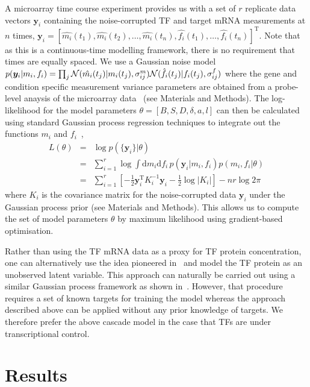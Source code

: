 \documentclass{pnastwo}
\begin{document}
\begin{article}
A microarray time course experiment provides us with a set of $r$
replicate data vectors $\bm y_i$ containing the noise-corrupted TF and target mRNA
measurements at $n$ times,
$\bm y_i=[\hat{m_i}(t_1),\hat{m_i}(t_2),\ldots,\hat{m_i}(t_n),\hat{f_i}(t_1),\ldots,\hat{f_i}(t_n)]^\mathrm{T}$. Note
that as this is a continuous-time modelling framework, there is no
requirement that times are equally spaced. We use a Gaussian noise model
$p(\bm y_i|m_i,f_i)=\prod_{j}{\cal
  N}(\hat{m_i}(t_j)|m_i(t_j),\sigma^m_{ij}){\cal
  N}(\hat{f_i}(t_j)|f_i(t_j),\sigma^f_{ij})$ where the gene and condition
specific measurement variance parameters are obtained from a probe-level anaysis of the microarray data~\cite{Liu2005,Pearson2009} (see
Materials and Methods). The log-likelihood for the model parameters
$\theta=[B,S,D,\delta,a,l]$ can then be calculated using standard Gaussian process regression
techniques to integrate out the functions $m_i$ and $f_i$~\cite{Rasmussen2006},
\begin{eqnarray*}
L(\theta) & = & \log p(\{\bm y_i\}|\theta) \\
& = & \sum_{i=1}^r \log \!\int \!\mathrm{d}m_i\mathrm{d}f_i\,
p(\bm y_i|m_i,f_i)p(m_i,f_i|\theta)  \\
& = & \sum_{i=1}^r \left[-\frac{1}{2}\bm y_i^\mathrm{T} K_i^{-1} \bm y_i -
\frac{1}{2}\log|K_i|\right] -nr\log 2\pi
\end{eqnarray*}
where $K_i$ is the covariance matrix for the
noise-corrupted data $\bm y_i$ under the Gaussian process prior (see
Materials and Methods). This allows us to compute the set of model
parameters $\theta$ by maximum
likelihood using gradient-based optimisation. 

Rather than using the TF mRNA data as a proxy for TF protein concentration,
one can alternatively use the idea pioneered
in~\cite{Barenco2006a} and model the TF protein as an unobserved
latent variable. This approach can naturally be carried out using a
similar Gaussian process framework as shown in~\cite{Gao2008}. However, that procedure requires a set of known
targets for training the model whereas the approach described above
can be applied without any prior knowledge of targets. We therefore
prefer the above cascade model in the case that TFs are under
transcriptional control. 

\section{Results}


\end{article}
\end{document}
